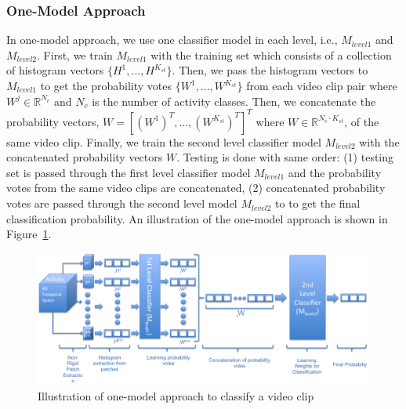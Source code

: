 \subsubsection{One-Model Approach}
\label{section:OneModelApproach}
In one-model approach, we use one classifier model in each level, i.e., $M_{level1}$ and $M_{level2}$. First, we train $M_{level1}$ with the training set which consists of a collection of histogram vectors $\{H^{1}, ..., H^{K_{st}}\}$. Then, we pass the histogram vectors to $M_{level1}$ to get the probability votes $\{W^{1}, ..., W^{K_{st}}\}$ from each video clip pair where $W^{j} \in \mathbb{R}^{N_{c}}$ and $N_{c}$ is the number of activity classes. Then, we concatenate the probability vectors, $W = \left[(W^{1})^{T}, ..., (W^{K_{st}})^{T}\right]^{T}$ where $W \in \mathbb{R}^{N_{c} \cdot K_{st}}$, of the same video clip. Finally, we train the second level classifier model $M_{level2}$ with the concatenated probability vectors $W$. Testing is done with same order: (1) testing set is passed through the first level classifier model $M_{level1}$ and the probability votes from the same video clips are concatenated, (2) concatenated probability votes are passed through the second level model $M_{level2}$ to to get the final classification probability. An illustration of the one-model approach is shown in Figure~\ref{fig:oneModelApproachIllustration}.
    
\begin{figure}[!htbp]
\begin{center}
\includegraphics[scale=0.50]{Figures/oneModelApproach3}
\end{center}
\caption{Illustration of one-model approach to classify a video clip \label{fig:oneModelApproachIllustration}}
\end{figure}



